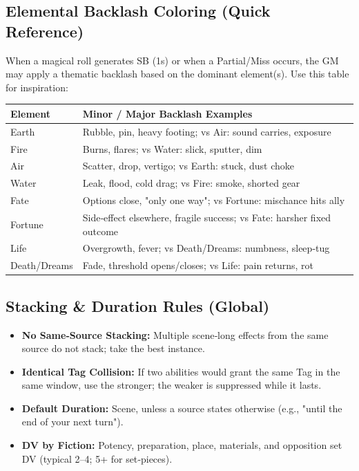 \subsection{Elemental Backlash Coloring (Quick Reference)}
When a magical roll generates SB (1s) or when a Partial/Miss occurs, the GM may apply a thematic backlash based on the dominant element(s). Use this table for inspiration:

\centering
\begin{longtable}{l l}
\toprule
\textbf{Element} & \textbf{Minor / Major Backlash Examples} \\
\midrule
Earth & Rubble, pin, heavy footing; vs Air: sound carries, exposure \\
Fire & Burns, flares; vs Water: slick, sputter, dim \\
Air & Scatter, drop, vertigo; vs Earth: stuck, dust choke \\
Water & Leak, flood, cold drag; vs Fire: smoke, shorted gear \\
Fate & Options close, "only one way"; vs Fortune: mischance hits ally \\
Fortune & Side‑effect elsewhere, fragile success; vs Fate: harsher fixed outcome \\
Life & Overgrowth, fever; vs Death/Dreams: numbness, sleep‑tug \\
Death/Dreams & Fade, threshold opens/closes; vs Life: pain returns, rot \\
\bottomrule
\end{longtable}

\subsection{Stacking \& Duration Rules (Global)}
\begin{itemize}
  \item \textbf{No Same‑Source Stacking:} Multiple scene‑long effects from the same source do not stack; take the best instance.
  \item \textbf{Identical Tag Collision:} If two abilities would grant the same Tag in the same window, use the stronger; the weaker is suppressed while it lasts.
  \item \textbf{Default Duration:} Scene, unless a source states otherwise (e.g., "until the end of your next turn").
  \item \textbf{DV by Fiction:} Potency, preparation, place, materials, and opposition set DV (typical 2–4; 5+ for set‑pieces).
\end{itemize}